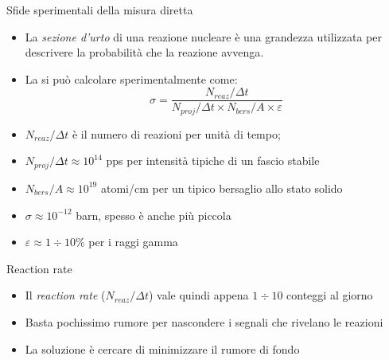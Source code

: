 \documentclass [xcolor=svgnames] {beamer}
\begin{document}
\begin{frame}{Sfide sperimentali della misura diretta}
	\begin{itemize}
		\item<1-> La \emph{sezione d'urto} di una reazione nucleare è una grandezza utilizzata per descrivere la probabilità che la reazione avvenga.
		\item<2-> La si può calcolare sperimentalmente come:
		\begin{equation}
			\sigma = \dfrac{N_{reaz}/\Delta t}{N_{proj}/\Delta t \times N_{bers}/A \times \varepsilon}
		\end{equation}
	\item<3-> $N_{reaz}/\Delta t$ è il numero di reazioni per unità di tempo;
	\item<4-> $N_{proj}/\Delta t \approx 10^{14}$ pps per intensità tipiche di un fascio stabile
	\item<5-> $N_{bers}/A \approx 10^{19}$ atomi/cm per un tipico bersaglio allo stato solido
	\item<6-> $\sigma \approx 10^{-12}$ barn, spesso è anche più piccola
	\item<7-> $\varepsilon \approx 1 \div 10 \%$ per i raggi gamma
	\end{itemize}
\end{frame}
\begin{frame}{Reaction rate}
	\begin{itemize}
		\item<1-> Il \emph{reaction rate} ($N_{reaz}/\Delta t$) vale quindi appena $1\div 10$ conteggi al giorno
		\item<2-> Basta pochissimo rumore per nascondere i segnali che rivelano le reazioni
		\item<3-> La soluzione è cercare di minimizzare il rumore di fondo 
	\end{itemize}
\end{frame}
\end{document}
